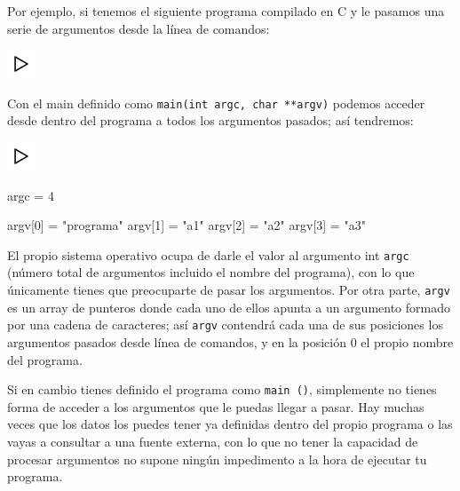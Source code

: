 \documentclass[
]{book}
\newenvironment{Shaded}{\begin{snugshade}}{\end{snugshade}}
\newcommand{\DecValTok}[1]{\textcolor[rgb]{0.00,0.00,0.81}{#1}}
\newcommand{\NormalTok}[1]{#1}
\newcommand{\StringTok}[1]{\textcolor[rgb]{0.31,0.60,0.02}{#1}}
\begin{document}
Por ejemplo, si tenemos el siguiente programa compilado en C y le pasamos una serie de argumentos desde la línea de comandos:

\includegraphics{./img/play.png}

\begin{Shaded}
\end{Shaded}

Con el main definido como \texttt{main(int\ argc,\ char\ **argv)} podemos acceder desde dentro del programa a todos los argumentos pasados; así tendremos:

\includegraphics{./img/play.png}

\begin{Shaded}
\begin{Highlighting}[]
\NormalTok{argc = }\DecValTok{4}

\NormalTok{argv[}\DecValTok{0}\NormalTok{] = }\StringTok{"programa"}
\NormalTok{argv[}\DecValTok{1}\NormalTok{] = }\StringTok{"a1"}
\NormalTok{argv[}\DecValTok{2}\NormalTok{] = }\StringTok{"a2"}
\NormalTok{argv[}\DecValTok{3}\NormalTok{] = }\StringTok{"a3"}
\end{Highlighting}
\end{Shaded}

El propio sistema operativo ocupa de darle el valor al argumento int \texttt{argc} (número total de argumentos incluido el nombre del programa), con lo que únicamente tienes que preocuparte de pasar los argumentos. Por otra parte, \texttt{argv} es un array de punteros donde cada uno de ellos apunta a un argumento formado por una cadena de caracteres; así \texttt{argv} contendrá cada una de sus posiciones los argumentos pasados desde línea de comandos, y en la posición 0 el propio nombre del programa.

Si en cambio tienes definido el programa como \texttt{main\ ()}, simplemente no tienes forma de acceder a los argumentos que le puedas llegar a pasar. Hay muchas veces que los datos los puedes tener ya definidas dentro del propio programa o las vayas a consultar a una fuente externa, con lo que no tener la capacidad de procesar argumentos no supone ningún impedimento a la hora de ejecutar tu programa.
\end{document}
